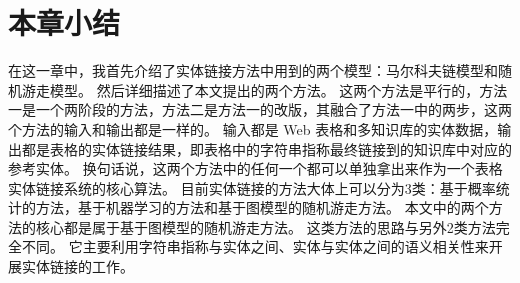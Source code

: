 \section{本章小结}
在这一章中，我首先介绍了实体链接方法中用到的两个模型：马尔科夫链模型和随机游走模型。
然后详细描述了本文提出的两个方法。
这两个方法是平行的，方法一是一个两阶段的方法，方法二是方法一的改版，其融合了方法一中的两步，这两个方法的输入和输出都是一样的。
输入都是 Web 表格和多知识库的实体数据，输出都是表格的实体链接结果，即表格中的字符串指称最终链接到的知识库中对应的参考实体。
换句话说，这两个方法中的任何一个都可以单独拿出来作为一个表格实体链接系统的核心算法。
目前实体链接的方法大体上可以分为3类：基于概率统计的方法，基于机器学习的方法和基于图模型的随机游走方法。
本文中的两个方法的核心都是属于基于图模型的随机游走方法。
这类方法的思路与另外2类方法完全不同。
它主要利用字符串指称与实体之间、实体与实体之间的语义相关性来开展实体链接的工作。

